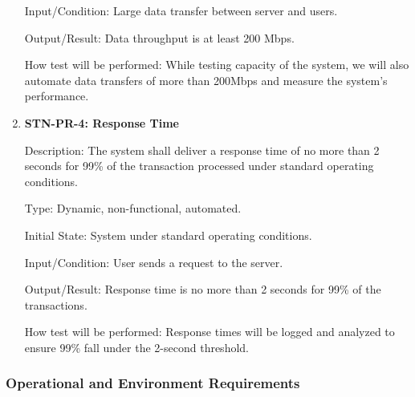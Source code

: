 \documentclass[12pt, titlepage]{article}
\begin{document}
\begin{enumerate}
Input/Condition: Large data transfer between server and users.

Output/Result: Data throughput is at least 200 Mbps.

How test will be performed: While testing capacity of the system, we will also automate data transfers of more than 200Mbps and measure the system’s performance. 


\item{\textbf{STN-PR-4: Response Time}}

Description: The system shall deliver a response time of no more than 2 seconds for 99\% of the transaction processed under standard operating conditions.

Type: Dynamic, non-functional, automated.

Initial State: System under standard operating conditions.

Input/Condition: User sends a request to the server.

Output/Result: Response time is no more than 2 seconds for 99\% of the transactions.

How test will be performed: Response times will be logged and analyzed to ensure 99\% fall under the 2-second threshold.

\end{enumerate}

\subsubsection{Operational and Environment Requirements}
\end{document}
